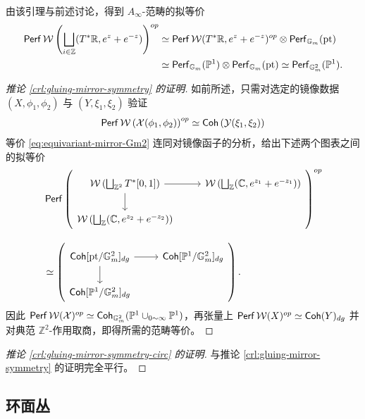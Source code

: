 由该引理与前述讨论，得到 $A_{\infty}$-范畴的拟等价 \begin{align}\label{eq:equivariant-mirror-Gm2}
    \begin{split}
    \operatorname{\mathsf{Perf}}\mathcal{W}\left(\bigsqcup_{i\in\mathbb{Z}} (T^{\ast}\mathbb{R},e^z+e^{-z})\right)^{op}&\simeq\operatorname{\mathsf{Perf}}\mathcal{W} (T^{\ast}\mathbb{R},e^z+e^{-z})^{op}\otimes\operatorname{\mathsf{Perf}}_{\mathbb{G}_m} (\mathrm{pt})\\ 
    &\simeq\operatorname{\mathsf{Perf}}_{\mathbb{G}_m} (\mathbb{P}^1)\otimes\operatorname{\mathsf{Perf}}_{\mathbb{G}_m} (\mathrm{pt})\simeq\operatorname{\mathsf{Perf}}_{\mathbb{G}_m^2} (\mathbb{P}^1).
    \end{split}
\end{align}
\begin{proof}[推论 \ref{crl:gluing-mirror-symmetry} 的证明]
    如前所述，只需对选定的镜像数据 $(X,\phi_1,\phi_2)$ 与 $(Y,\xi_1,\xi_2)$ 验证 \[
        \operatorname{\mathsf{Perf}}\mathcal{W}\left(\mathcal{X} (\phi_1,\phi_2)\right)^{op}\simeq\operatorname{\mathsf{Coh}}\left(\mathcal{Y}(\xi_1,\xi_2)\right)
    \]等价 \eqref{eq:equivariant-mirror-Gm2} 连同对镜像函子的分析，给出下述两个图表之间的拟等价 \[
\begin{aligned}
&\Perf\left(
\begin{tikzcd}
\mathcal{W}\left(\bigsqcup_{\mathbb{Z}^2}T^{\ast}[0,1]\right)
  \arrow[r]\arrow[d]
&
\mathcal{W}\left(\bigsqcup_{\mathbb{Z}}(\mathbb{C},e^{z_1}+e^{-z_1})\right)
\\
\mathcal{W}\left(\bigsqcup_{\mathbb{Z}}(\mathbb{C},e^{z_2}+e^{-z_2})\right)
&
\end{tikzcd}
\right)^{op}
\\[1em]
&\simeq
\left(
\begin{tikzcd}
\Coh[\mathrm{pt}/\mathbb{G}_m^2]_{dg}\arrow[r]\arrow[d]
&
\Coh[\mathbb{P}^1/\mathbb{G}_m^2]_{dg}
\\
\Coh[\mathbb{P}^1/\mathbb{G}_m^2]_{dg}
&
\end{tikzcd}
\right).
\end{aligned}
\]因此 $\operatorname{\mathsf{Perf}}\mathcal{W} (\mathcal{X})^{op}\simeq\operatorname{\mathsf{Coh}}_{\mathbb{G}_m^2} (\mathbb{P}^1\cup_{0\sim\infty}\mathbb{P}^1)$，再张量上 $\operatorname{\mathsf{Perf}}\mathcal{W} (X)^{op}\simeq\operatorname{\mathsf{Coh}} (Y)_{dg}$ 并对典范 $\mathbb{Z}^2$-作用取商，即得所需的范畴等价。
\end{proof}
\begin{proof}[推论 \ref{crl:gluing-mirror-symmetry-circ} 的证明]
    与推论 \ref{crl:gluing-mirror-symmetry} 的证明完全平行。
\end{proof}

\subsection{环面丛}

